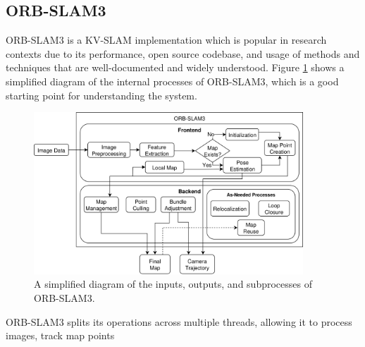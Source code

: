 \subsection{ORB-SLAM3}

ORB-SLAM3 is a KV-SLAM implementation which is popular in research contexts due to its performance, open source codebase, and usage of methods and techniques that are well-documented and widely understood. Figure \ref{fig:orb-slam3} shows a simplified diagram of the internal processes of ORB-SLAM3, which is a good starting point for understanding the system.

\begin{figure}[!ht]
    \centering
    \includegraphics[width=0.9\textwidth]{resources/orb-slam3.png}
    \caption[Simplified ORB-SLAM3 Operational Diagram]{A simplified diagram of the inputs, outputs, and subprocesses of ORB-SLAM3.}
    \label{fig:orb-slam3}
\end{figure}

ORB-SLAM3 splits its operations across multiple threads, allowing it to process images, track map points